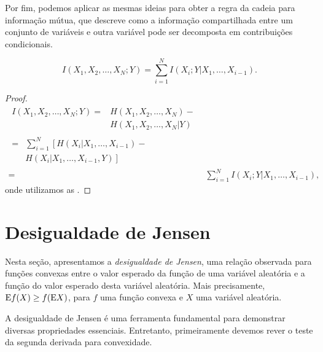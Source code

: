 Por fim, podemos aplicar as mesmas ideias para obter a regra da cadeia para
informação mútua, que descreve como a informação compartilhada entre um
conjunto de variáveis e outra variável pode ser decomposta em contribuições
condicionais. 
\begin{proposition}\label{pro:regracadeiainfmut}
\begin{equation}\label{eq:regracadeiainfmut}
I(X_1, X_2, \ldots, X_N ; Y) = \sum_{i=1}^{N} I(X_i;Y|X_1, \ldots, X_{i-1}) .
\end{equation}
\end{proposition}
\begin{proof}
\begin{subequations}\label{eq:dmregracadeiainfmut}
\begin{align}
  \begin{split}
  I(X_1, X_2, \ldots, X_N ; Y) ={}& H(X_1, X_2, \ldots, X_N) - \\
                                  & H(X_1, X_2, \ldots, X_N | Y) 
  \end{split}\\
  \begin{split}
         ={}& \sum_{i=1}^{N} \left[ H(X_i | X_1, \ldots, X_{i-1}) - \right.\\
            & \left. H(X_i | X_1, \ldots, X_{i-1}, Y) \right] 
  \end{split}\\
         ={}& \sum_{i=1}^{N} I(X_i;Y|X_1, \ldots, X_{i-1}) ,
\end{align}
\end{subequations}
onde utilizamos as .
\end{proof}





\section{Desigualdade de Jensen}\label{sec:desjensen}
Nesta seção, apresentamos a \emph{desigualdade de Jensen}, uma relação observada para
funções convexas entre o valor esperado da função de uma variável
aleatória e a função do valor esperado desta variável aleatória. Mais precisamente,
$\mathrm{E} f(X) \geq f(\mathrm{E} X)$, para $f$ uma função convexa e $X$ uma variável aleatória.

A desigualdade de Jensen é uma ferramenta fundamental para demonstrar diversas propriedades essenciais.
Entretanto, primeiramente devemos rever o teste da segunda derivada para convexidade.

